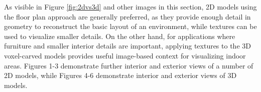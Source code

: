 \message{ !name(masters.tex)}\documentclass[]{spie}  %
\begin{document}
As visible in Figure \ref{fig:2dvs3d} and other images in this
section, 2D models using the floor plan approach are generally
preferred, as they provide enough detail in geometry to reconstruct
the basic layout of an environment, while textures can be used to
visualize smaller details. On the other hand, for applications where
furniture and smaller interior details are important, applying
textures to the 3D voxel-carved models provides useful image-based
context for visualizing indoor areas. Figures 1-3 demonstrate further
interior and exterior views of a number of 2D models, while Figures
4-6 demonstrate interior and exterior views of 3D models.


\end{document}
